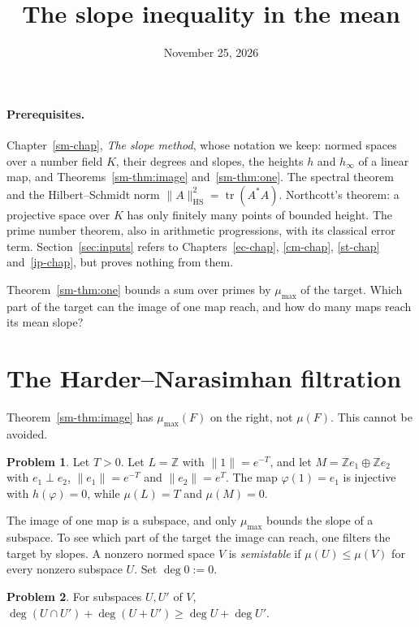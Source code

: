 \documentclass[reqno]{amsart}
\title{The slope inequality in the mean}
\author{}
\date{November 25, 2026}
\newcounter{chap}
\theoremstyle{definition}
\newtheorem{problem}{Problem}[section]
\theoremstyle{plain}
\newcommand{\Z}{\mathbb{Z}}
\newcommand{\mumax}{\mu_{\max}}
\newcommand{\tr}{\operatorname{tr}}
\newcommand{\HS}{\mathrm{HS}}
\begin{document}
\maketitle
{}\label{chap}

\paragraph{Prerequisites.}
Chapter~\ref{sm-chap}, \emph{The slope method}, whose notation we keep: normed spaces over a number field \(K\), their degrees and slopes, the heights \(h\) and \(h_\infty\) of a linear map, and Theorems~\ref{sm-thm:image} and~\ref{sm-thm:one}.  The spectral theorem and the Hilbert--Schmidt norm \(\lVert A \rVert_\HS^2 = \tr(A^*A)\).  Northcott's theorem: a projective space over \(K\) has only finitely many points of bounded height.  The prime number theorem, also in arithmetic progressions, with its classical error term.  Section~\ref{sec:inputs} refers to Chapters~\ref{ec-chap}, \ref{cm-chap}, \ref{st-chap} and~\ref{ip-chap}, but proves nothing from them.

Theorem~\ref{sm-thm:one} bounds a sum over primes by \(\mumax\) of the target.  Which part of the target can the image of one map reach, and how do many maps reach its mean slope?


\section{The Harder--Narasimhan filtration}\label{sec:hn}

Theorem~\ref{sm-thm:image} has \(\mumax(F)\) on the right, not \(\mu(F)\).  This cannot be avoided.

\begin{problem}\label{pr:need-max}
Let \(T > 0\).  Let \(L = \Z\) with \(\lVert 1 \rVert = e^{-T}\), and let \(M = \Z e_1 \oplus \Z e_2\) with \(e_1 \perp e_2\), \(\lVert e_1 \rVert = e^{-T}\) and \(\lVert e_2 \rVert = e^T\).  The map \(\varphi(1) = e_1\) is injective with \(h(\varphi) = 0\), while \(\mu(L) = T\) and \(\mu(M) = 0\).
\end{problem}

The image of one map is a subspace, and only \(\mumax\) bounds the slope of a subspace.  To see which part of the target the image can reach, one filters the target by slopes.  A nonzero normed space \(V\) is \emph{semistable} if \(\mu(U) \le \mu(V)\) for every nonzero subspace \(U\).  Set \(\deg 0 := 0\).

\begin{problem}\label{pr:submodular}
For subspaces \(U, U'\) of \(V\), \(\deg(U \cap U') + \deg(U + U') \ge \deg U + \deg U'\).
\end{problem}
\end{document}

